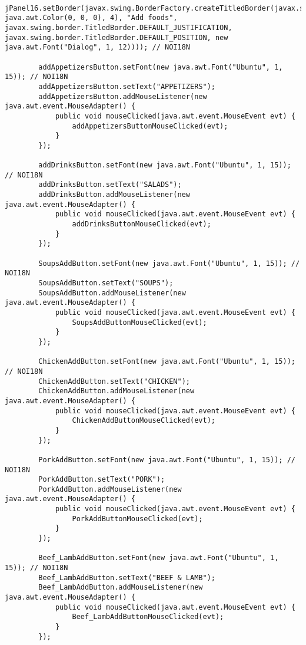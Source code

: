 \documentclass[12pt,a4paper]{article}
\begin{document}
\begin{lstlisting}
        jPanel16.setBorder(javax.swing.BorderFactory.createTitledBorder(javax.swing.BorderFactory.createTitledBorder(javax.swing.BorderFactory.createLineBorder(new java.awt.Color(0, 0, 0), 4), "Add foods", javax.swing.border.TitledBorder.DEFAULT_JUSTIFICATION, javax.swing.border.TitledBorder.DEFAULT_POSITION, new java.awt.Font("Dialog", 1, 12)))); // NOI18N

        addAppetizersButton.setFont(new java.awt.Font("Ubuntu", 1, 15)); // NOI18N
        addAppetizersButton.setText("APPETIZERS");
        addAppetizersButton.addMouseListener(new java.awt.event.MouseAdapter() {
            public void mouseClicked(java.awt.event.MouseEvent evt) {
                addAppetizersButtonMouseClicked(evt);
            }
        });

        addDrinksButton.setFont(new java.awt.Font("Ubuntu", 1, 15)); // NOI18N
        addDrinksButton.setText("SALADS");
        addDrinksButton.addMouseListener(new java.awt.event.MouseAdapter() {
            public void mouseClicked(java.awt.event.MouseEvent evt) {
                addDrinksButtonMouseClicked(evt);
            }
        });

        SoupsAddButton.setFont(new java.awt.Font("Ubuntu", 1, 15)); // NOI18N
        SoupsAddButton.setText("SOUPS");
        SoupsAddButton.addMouseListener(new java.awt.event.MouseAdapter() {
            public void mouseClicked(java.awt.event.MouseEvent evt) {
                SoupsAddButtonMouseClicked(evt);
            }
        });

        ChickenAddButton.setFont(new java.awt.Font("Ubuntu", 1, 15)); // NOI18N
        ChickenAddButton.setText("CHICKEN");
        ChickenAddButton.addMouseListener(new java.awt.event.MouseAdapter() {
            public void mouseClicked(java.awt.event.MouseEvent evt) {
                ChickenAddButtonMouseClicked(evt);
            }
        });

        PorkAddButton.setFont(new java.awt.Font("Ubuntu", 1, 15)); // NOI18N
        PorkAddButton.setText("PORK");
        PorkAddButton.addMouseListener(new java.awt.event.MouseAdapter() {
            public void mouseClicked(java.awt.event.MouseEvent evt) {
                PorkAddButtonMouseClicked(evt);
            }
        });

        Beef_LambAddButton.setFont(new java.awt.Font("Ubuntu", 1, 15)); // NOI18N
        Beef_LambAddButton.setText("BEEF & LAMB");
        Beef_LambAddButton.addMouseListener(new java.awt.event.MouseAdapter() {
            public void mouseClicked(java.awt.event.MouseEvent evt) {
                Beef_LambAddButtonMouseClicked(evt);
            }
        });


\end{lstlisting}
\end{document}
